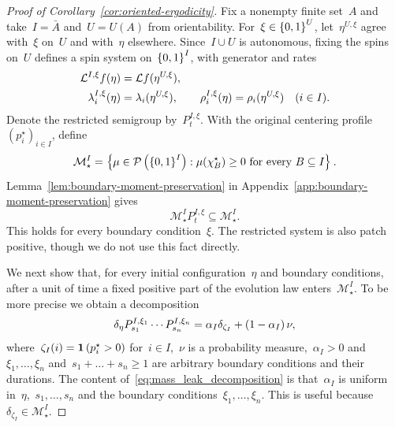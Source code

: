 \documentclass[EJP,preprint,NODS,nobera]{ejpecp}
\begin{document}
\begin{proof}[Proof of Corollary~\ref{cor:oriented-ergodicity}]
    

Fix a nonempty finite set~$A$ and take~$I=\bar A$ and~$U=U(A)$ from
orientability. For~$\xi\in\left\{0,1\right\}^U$, let~$\eta^{U,\xi}$ agree with~$\xi$
on~$U$ and with~$\eta$ elsewhere. Since~$I\cup U$ is autonomous, fixing
the spins on~$U$ defines a spin system on~$\left\{0,1\right\}^I$, with generator
and rates
\begin{align*}
\mathcal{L}^{I,\xi}f(\eta)&=\mathcal{L} f(\eta^{U,\xi}),\\
\lambda_i^{I,\xi}(\eta)&=\lambda_i(\eta^{U,\xi}),
\qquad
\rho_i^{I,\xi}(\eta)=\rho_i(\eta^{U,\xi})
\quad(i\in I).
\end{align*}
Denote the restricted semigroup by~$P_t^{I,\xi}$. With the original centering profile~$(p_i^\star)_{i\in I}$, define
\begin{equation*}
\mathcal M_\star^I
=\left\{\mu\in\mathcal P\left(\left\{0,1\right\}^I\right):
       \mu(\chi_B^\star)\geq0\text{ for every }B\subseteq I\right\}.
\end{equation*}
Lemma~\ref{lem:boundary-moment-preservation} in
Appendix~\ref{app:boundary-moment-preservation} gives
\begin{equation*}
\mathcal M_\star^I P_t^{I,\xi}\subseteq\mathcal M_\star^I.
\end{equation*}
This holds for every boundary condition~$\xi$. The restricted system is also patch positive, though we do not use this fact directly.

We next show that, for every initial configuration~$\eta$ and boundary conditions, after a unit of time a fixed positive part of the evolution law enters~$\mathcal{M}_\star^I$. To be more precise we obtain a decomposition
\begin{equation}\label{eq:mass_leak_decomposition}
    \delta_\eta P_{s_1}^{I,\xi_1}\cdots P_{s_n}^{I,\xi_n} = \alpha_I \delta_{\zeta_I} + \left(1-\alpha_I\right)\nu,
\end{equation}
where~$\zeta_I(i) = \mathbf{1}\left(p_i^\star > 0\right)$ for~$i\in I$,~$\nu$ is a probability measure,~$\alpha_I>0$ and~$\xi_1,\dots,\xi_n$ and~$s_1+\dots +s_n\geq 1$ are arbitrary boundary conditions and their durations. The content of~\eqref{eq:mass_leak_decomposition} is that~$\alpha_I$ is uniform in~$\eta$,~$s_1,\dots,s_n$ and the boundary conditions~$\xi_1,\dots,\xi_n$. This is useful because~$\delta_{\zeta_I}\in\mathcal{M}_\star^I$.


\end{proof}
\end{document}
